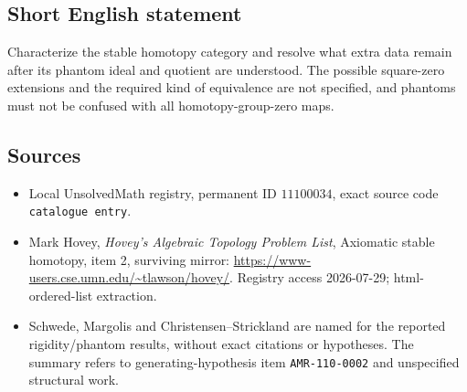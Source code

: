 \documentclass[11pt]{article}
\begin{document}
\subsection{Short English statement}
Characterize the stable homotopy category and resolve what extra data remain after its phantom ideal and quotient are understood. The possible square-zero extensions and the required kind of equivalence are not specified, and phantoms must not be confused with all homotopy-group-zero maps.
\subsection{Sources}
\begin{itemize}
\item Local UnsolvedMath registry, permanent ID \(11100034\), exact source code \texttt{catalogue entry}.
\item Mark Hovey, \emph{Hovey's Algebraic Topology Problem List}, Axiomatic stable homotopy, item 2, surviving mirror: \url{https://www-users.cse.umn.edu/~tlawson/hovey/}. Registry access 2026-07-29; html-ordered-list extraction.
\item Schwede, Margolis and Christensen--Strickland are named for the reported rigidity/phantom results, without exact citations or hypotheses. The summary refers to generating-hypothesis item \texttt{AMR-110-0002} and unspecified structural work.
\end{itemize}
\end{document}
